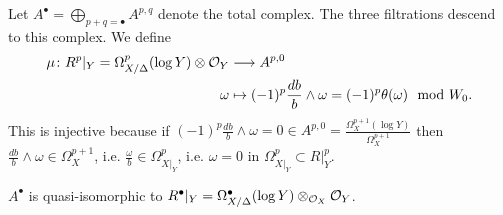 \documentclass[../main.tex]{subfiles}
\begin{document}
Let $A^\bullet = \bigoplus_{p+q=\bullet}A^{p,q} $ denote the total complex. The three filtrations descend to this complex.
We define
\begin{align*}
\mu \colon R^p|_Y = \Omega^p_{{X}/\Delta}(\log Y)\otimes \mathcal{O}_Y &\longrightarrow A^{p,0} \\
\omega &\mapsto (-1)^p \frac{db}{b} \wedge \omega = (-1)^p \theta(\omega) \mod W_0.
\end{align*}
This is injective because if $ (-1)^p \frac{db}{b} \wedge \omega=0 \in A^{p,0} = \frac{\Omega_X^{p+1}(\log Y)}{\Omega_X^{p+1}}$ then $\frac{db}{b} \wedge \omega \in \Omega_X^{p+1}$, i.e. $\frac{\omega}{b} \in \Omega_{X|_Y}^{p}$, i.e. $\omega =0$ in $\Omega_{X|_Y}^{p} \subset R|_Y^{p}$.
\begin{theorem}
$A^{\bullet}$ is quasi-isomorphic to $R^\bullet|_Y =\Omega^\bullet_{ X/\Delta}(\log Y)\otimes_{\mathcal{O}_X} \mathcal{O}_Y$.
\end{theorem} 
\end{document}
